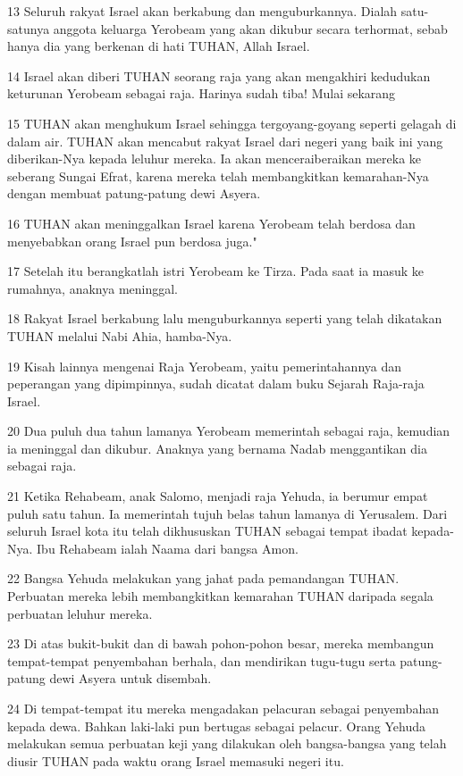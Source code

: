 \par 13 Seluruh rakyat Israel akan berkabung dan menguburkannya. Dialah satu-satunya anggota keluarga Yerobeam yang akan dikubur secara terhormat, sebab hanya dia yang berkenan di hati TUHAN, Allah Israel.
\par 14 Israel akan diberi TUHAN seorang raja yang akan mengakhiri kedudukan keturunan Yerobeam sebagai raja. Harinya sudah tiba! Mulai sekarang
\par 15 TUHAN akan menghukum Israel sehingga tergoyang-goyang seperti gelagah di dalam air. TUHAN akan mencabut rakyat Israel dari negeri yang baik ini yang diberikan-Nya kepada leluhur mereka. Ia akan menceraiberaikan mereka ke seberang Sungai Efrat, karena mereka telah membangkitkan kemarahan-Nya dengan membuat patung-patung dewi Asyera.
\par 16 TUHAN akan meninggalkan Israel karena Yerobeam telah berdosa dan menyebabkan orang Israel pun berdosa juga."
\par 17 Setelah itu berangkatlah istri Yerobeam ke Tirza. Pada saat ia masuk ke rumahnya, anaknya meninggal.
\par 18 Rakyat Israel berkabung lalu menguburkannya seperti yang telah dikatakan TUHAN melalui Nabi Ahia, hamba-Nya.
\par 19 Kisah lainnya mengenai Raja Yerobeam, yaitu pemerintahannya dan peperangan yang dipimpinnya, sudah dicatat dalam buku Sejarah Raja-raja Israel.
\par 20 Dua puluh dua tahun lamanya Yerobeam memerintah sebagai raja, kemudian ia meninggal dan dikubur. Anaknya yang bernama Nadab menggantikan dia sebagai raja.
\par 21 Ketika Rehabeam, anak Salomo, menjadi raja Yehuda, ia berumur empat puluh satu tahun. Ia memerintah tujuh belas tahun lamanya di Yerusalem. Dari seluruh Israel kota itu telah dikhususkan TUHAN sebagai tempat ibadat kepada-Nya. Ibu Rehabeam ialah Naama dari bangsa Amon.
\par 22 Bangsa Yehuda melakukan yang jahat pada pemandangan TUHAN. Perbuatan mereka lebih membangkitkan kemarahan TUHAN daripada segala perbuatan leluhur mereka.
\par 23 Di atas bukit-bukit dan di bawah pohon-pohon besar, mereka membangun tempat-tempat penyembahan berhala, dan mendirikan tugu-tugu serta patung-patung dewi Asyera untuk disembah.
\par 24 Di tempat-tempat itu mereka mengadakan pelacuran sebagai penyembahan kepada dewa. Bahkan laki-laki pun bertugas sebagai pelacur. Orang Yehuda melakukan semua perbuatan keji yang dilakukan oleh bangsa-bangsa yang telah diusir TUHAN pada waktu orang Israel memasuki negeri itu.
